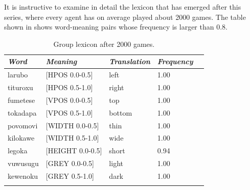 It is instructive to examine in detail the lexicon 
that has emerged after this series, where every agent
has on average played about 2000 games. The table shown in  
shows word-meaning pairs whose 
frequency is larger than 0.8. 
\begin{table}
\begin{center}
\begin{tabular}{ l  l  l  l  l }
\lsptoprule
{\it Word}&{\it Meaning}& {\it Translation} & {\it Frequency} \\ \midrule
larubo & [HPOS 0.0-0.5] & left & 1.00 \\ \midrule
tituroxu & [HPOS 0.5-1.0] & right & 1.00 \\ \midrule
fumetese & [VPOS 0.0-0.5] & top & 1.00 \\ \midrule
tokadapa & [VPOS 0.5-1.0] & bottom & 1.00 \\ \midrule
povomovi & [WIDTH 0.0-0.5] & thin & 1.00 \\ \midrule
kilokawe & [WIDTH 0.5-1.0] & wide & 1.00 \\ \midrule
legoka & [HEIGHT 0.0-0.5] & short & 0.94\\ \midrule 
vuwusugu & [GREY 0.0-0.5] & light & 1.00 \\ \midrule
kewenoku & [GREY 0.5-1.0] & dark & 1.00 \\ \midrule
\lspbottomrule
\end{tabular}
\caption{\label{tab:after2000} Group lexicon after 2000 games.}
\end{center}
\end{table}

